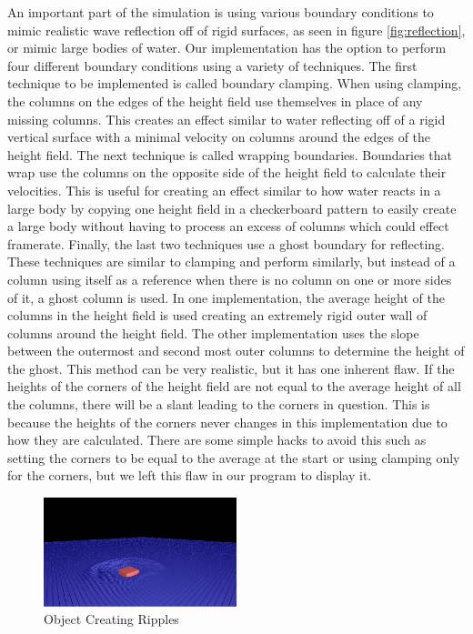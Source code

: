 \documentclass[11pt]{article}
\begin{document}
An important part of the simulation is using various boundary conditions to 
mimic realistic wave reflection off of rigid surfaces, as seen in figure 
\ref{fig:reflection}, or mimic large bodies of 
water. Our implementation has the option to perform four different boundary 
conditions using a variety of techniques. The first technique to be implemented 
is called boundary clamping. When using clamping, the columns on the edges of 
the height field use themselves in place of any missing columns. This creates 
an effect similar to water reflecting off of a rigid vertical surface with a 
minimal velocity on columns around the edges of the height field. The next 
technique is called wrapping boundaries. Boundaries that wrap use the columns 
on the opposite side of the height field to calculate their velocities. This is 
useful for creating an effect similar to how water reacts in a large body by 
copying one height field in a checkerboard pattern to easily create a large 
body without having to process an excess of columns which could effect 
framerate. Finally, the last two techniques use a ghost boundary for 
reflecting. These techniques are similar to clamping and perform similarly, but 
instead of a column using itself as a reference when there is no column on one 
or more sides of it, a ghost column is used. In one implementation, the average 
height of the columns in the height field is used creating an extremely rigid 
outer wall of columns around the height field. The other implementation uses 
the slope between the outermost and second most outer columns to determine the 
height of the ghost. This method can be very realistic, but it has one inherent 
flaw. If the heights of the corners of the height field are not equal to the 
average height of all the columns, there will be a slant leading to the corners 
in question. This is because the heights of the corners never changes in this 
implementation due to how they are calculated. There are some simple hacks to 
avoid this such as setting the corners to be equal to the average at the start 
or using clamping only for the corners, but we left this flaw in our program to 
display it.

\begin{figure}[H]
    \caption{Object Creating Ripples}
    \label{fig:ripples}
    \centering
    \includegraphics[width=0.5\textwidth]{../www/images/objectRipples}
\end{figure}
\end{document}

